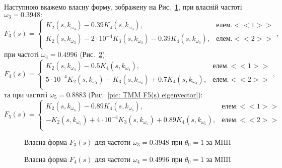 Наступною вкажемо власну форму, зображену на Рис.~\ref{pic: TMM F3(s) eigenvector}, при власній частоті $\omega_3 = 0.3948:$
\begin{equation}\label{eq: TMM F3(s) eigenvector}
    F_3(s) = 
    \begin{cases*}
        K_2(s,k_{\omega_3}) - 0.39 K_4(s,k_{\omega_3}), & елем. <<1>> \\
        K_2(s,k_{\omega_3}) - 2\cdot 10^{-4} K_3(s,k_{\omega_3}) - 0.39 K_4(s,k_{\omega_3}), & елем. <<2>> \\
    \end{cases*},
\end{equation}
при частоті $\omega_4 = 0.4996$ (Рис.~\ref{pic: TMM F4(s) eigenvector}):
\begin{equation}\label{eq: TMM F4(s) eigenvector}
    F_4(s) = 
    \begin{cases*}
        K_2(s,k_{\omega_4}) - 0.5 K_4(s,k_{\omega_4}), & елем. <<1>> \\
        5\cdot 10^{-4} K_2(s,k_{\omega_4}) - K_3(s,k_{\omega_4}) + 0.7 K_4(s,k_{\omega_4}), & елем. <<2>> \\
    \end{cases*},
\end{equation}
та при частоті $\omega_5 = 0.8883$ (Рис.~\ref{pic: TMM F5(s) eigenvector}):
\begin{equation}\label{eq: TMM F5(s) eigenvector}
    F_5(s) = 
    \begin{cases*}
        K_2(s,k_{\omega_5}) - 0.89 K_4(s,k_{\omega_5}), & елем. <<1>> \\
        -K_2(s,k_{\omega_5}) + 4\cdot 10^{-4} K_3(s,k_{\omega_5}) + 0.89 K_4(s,k_{\omega_5}), & елем. <<2>> \\
    \end{cases*}
\end{equation}

\begin{figure}[H]\centering
    \resizebox{\linewidth}{!}{}
    \caption{Власна форма $F_3(s)$ для частоти $\omega_3 = 0.3948$ при $\theta_0=1$ за МПП}
    \label{pic: TMM F3(s) eigenvector}
\end{figure}

\begin{figure}[H]\centering
    \resizebox{\linewidth}{!}{}
    \caption{Власна форма $F_4(s)$ для частоти $\omega_4 = 0.4996$ при $\theta_0=1$ за МПП}
    \label{pic: TMM F4(s) eigenvector}
\end{figure}

